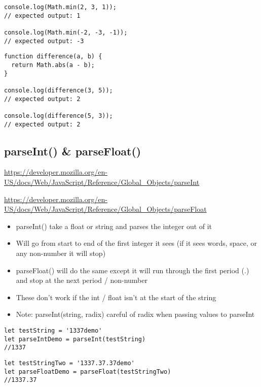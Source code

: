 \documentclass[10pt]{article}
\begin{document}
\begin{lstlisting}[title=Example Math.min(), captionpos=t]
console.log(Math.min(2, 3, 1));
// expected output: 1

console.log(Math.min(-2, -3, -1));
// expected output: -3
\end{lstlisting}


\begin{lstlisting}[title=Example Math.abs(), captionpos=t]
function difference(a, b) {
  return Math.abs(a - b);
}

console.log(difference(3, 5));
// expected output: 2

console.log(difference(5, 3));
// expected output: 2
\end{lstlisting}
\medskip %




\medskip %
\pagebreak
\subsection{parseInt() \& parseFloat()}

\url{https://developer.mozilla.org/en-US/docs/Web/JavaScript/Reference/Global_Objects/parseInt}

\medskip

\url{https://developer.mozilla.org/en-US/docs/Web/JavaScript/Reference/Global_Objects/parseFloat}


\begin{itemize}
	\item parseInt() take a float or string and parses the integer out of it
	\item Will go from start to end of the first integer it sees (if it sees words, space, or any non-number it will stop) 
	\item parseFloat() will do the same except it will run through the first period (.) and stop at the next period / non-number
	\item These don't work if the int / float isn't at the start of the string
	\item Note: parseInt(string, radix) careful of radix when passing values to parseInt
\end{itemize}

\begin{lstlisting}[title=Example parseInt(), captionpos=t]
let testString = '1337demo' 
let parseIntDemo = parseInt(testString)
//1337
\end{lstlisting}

\begin{lstlisting}[title=Example parseFloat(), captionpos=t]
let testStringTwo = '1337.37.37demo'
let parseFloatDemo = parseFloat(testStringTwo)
//1337.37
\end{lstlisting}
\end{document}
